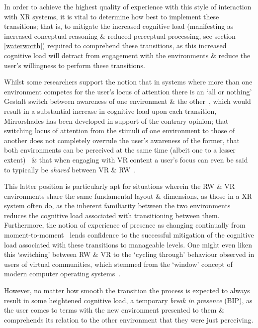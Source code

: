In order to achieve the highest quality of experience with this style of interaction with XR systems, it is vital to determine how best to implement these transitions; that is, to mitigate the increased cognitive load (manifesting as increased conceptual reasoning \& reduced perceptual processing, see section \ref{waterworth}) required to comprehend these transitions, as this increased cognitive load will detract from engagement with the environments \& reduce the user's willingness to perform these transitions.

Whilst some researchers support the notion that in systems where more than one environment competes for the user's locus of attention there is an `all or nothing' Gestalt switch between awareness of one environment \& the other~\cite{Slater2002}, which would result in a substantial increase in cognitive load upon each transition, Mirrorshades has been developed in support of the contrary opinion; that switching locus of attention from the stimuli of one environment to those of another does not completely overrule the user's awareness of the former, that both environments can be perceived at the same time (albeit one to a lesser extent)~\cite{Ijsselsteijn2001} \& that when engaging with VR content a user's focus can even be said to typically be \textit{shared} between VR \& RW~\cite{Waterworth2001}.

This latter position is particularly apt for situations wherein the RW \& VR environments share the same fundamental layout \& dimensions, as those in a XR system often do, as the inherent familiarity between the two environments reduces the cognitive load associated with transitioning between them. Furthermore, the notion of experience of presence as changing continually from moment-to-moment~\cite{Heeter2003, Ijsselsteijn1998} lends confidence to the successful mitigation of the cognitive load associated with these transitions to manageable levels. One might even liken this `switching' between RW \& VR to the `cycling through' behaviour observed in users of virtual communities, which stemmed from the `window' concept of modern computer operating systems~\cite{Turkle2004}.

However, no matter how smooth the transition the process is expected to always result in some heightened cognitive load, a temporary \textit{break in presence}\breakinpresencefootnote{} (BIP), as the user comes to terms with the new environment presented to them \& comprehends its relation to the other environment that they were just perceiving.

